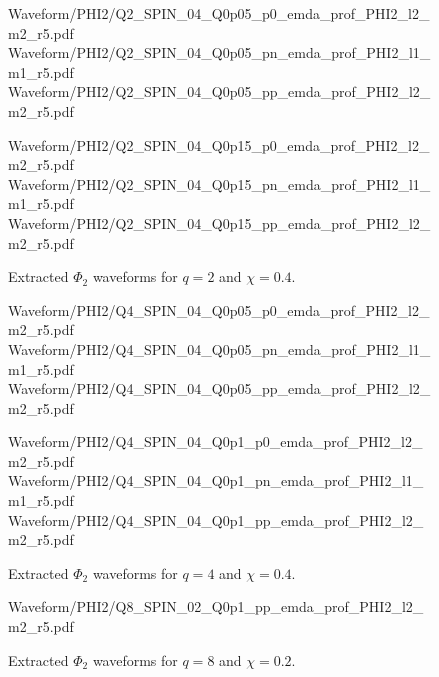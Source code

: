 \begin{figure}[p]
\centering

{Waveform/PHI2/Q2_SPIN_04_Q0p05_p0_emda_prof_PHI2_l2_m2_r5.pdf}
\hfill
{}
{Waveform/PHI2/Q2_SPIN_04_Q0p05_pn_emda_prof_PHI2_l1_m1_r5.pdf}
\hfill
{}
{Waveform/PHI2/Q2_SPIN_04_Q0p05_pp_emda_prof_PHI2_l2_m2_r5.pdf}

\vspace{0.6em}

{Waveform/PHI2/Q2_SPIN_04_Q0p15_p0_emda_prof_PHI2_l2_m2_r5.pdf}
\hfill
{}
{Waveform/PHI2/Q2_SPIN_04_Q0p15_pn_emda_prof_PHI2_l1_m1_r5.pdf}
\hfill
{}
{Waveform/PHI2/Q2_SPIN_04_Q0p15_pp_emda_prof_PHI2_l2_m2_r5.pdf}

\caption{Extracted \(\Phi_2\) waveforms for \(q=2\) and \(\chi=0.4\).}
\label{fig:phi2_catalog_q2_chi04}
\end{figure}

\begin{figure}[p]
\centering

{Waveform/PHI2/Q4_SPIN_04_Q0p05_p0_emda_prof_PHI2_l2_m2_r5.pdf}
\hfill
{}
{Waveform/PHI2/Q4_SPIN_04_Q0p05_pn_emda_prof_PHI2_l1_m1_r5.pdf}
\hfill
{}
{Waveform/PHI2/Q4_SPIN_04_Q0p05_pp_emda_prof_PHI2_l2_m2_r5.pdf}

\vspace{0.6em}

{Waveform/PHI2/Q4_SPIN_04_Q0p1_p0_emda_prof_PHI2_l2_m2_r5.pdf}
\hfill
{}
{Waveform/PHI2/Q4_SPIN_04_Q0p1_pn_emda_prof_PHI2_l1_m1_r5.pdf}
\hfill
{}
{Waveform/PHI2/Q4_SPIN_04_Q0p1_pp_emda_prof_PHI2_l2_m2_r5.pdf}

\caption{Extracted \(\Phi_2\) waveforms for \(q=4\) and \(\chi=0.4\).}
\label{fig:phi2_catalog_q4_chi04}
\end{figure}

\begin{figure}[p]
\centering

{Waveform/PHI2/Q8_SPIN_02_Q0p1_pp_emda_prof_PHI2_l2_m2_r5.pdf}

\caption{Extracted \(\Phi_2\) waveforms for \(q=8\) and \(\chi=0.2\).}
\label{fig:phi2_catalog_q8_chi02}
\end{figure}


